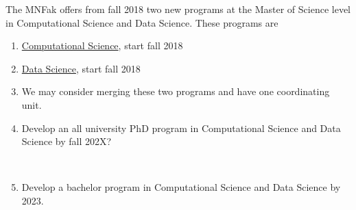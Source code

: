 \documentclass[oneside,final,10pt]{article}
\begin{document}
The MNFak  offers from fall 2018 two new programs at the Master of Science level in Computational Science and Data Science. These programs are
\begin{enumerate}
\item \href{{http://www.uio.no/english/studies/programmes/computational-science-master/index.html}}{Computational Science}, start fall 2018

\item \href{{http://www.uio.no/english/studies/programmes/datascience-master/index.html}}{Data Science}, start fall 2018

\item We may consider merging these two programs and have one coordinating unit.
\item Develop an all university PhD program in Computational Science and Data Science by fall 202X?


\

\item Develop a bachelor program in Computational Science and Data Science by 2023.
\end{enumerate}

\noindent
\end{document}

